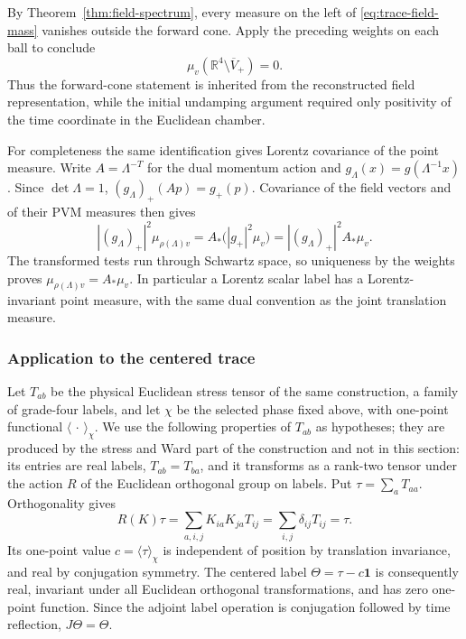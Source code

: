 By Theorem~\ref{thm:field-spectrum}, every measure on the left of
\eqref{eq:trace-field-mass} vanishes outside the forward cone.
Apply the preceding weights on each ball to conclude
\begin{equation}\label{eq:trace-forward}
 \mu_v(\mathbb R^4\setminus\overline V_+)=0.
\end{equation}
Thus the forward-cone statement is inherited from the reconstructed field
representation, while the initial undamping argument required only
positivity of the time coordinate in the Euclidean chamber.

For completeness the same identification gives Lorentz covariance of the
point measure. Write $A=\Lambda^{-T}$ for the dual momentum action and
$g_\Lambda(x)=g(\Lambda^{-1}x)$. Since $\det\Lambda=1$,
$(g_\Lambda)_+(Ap)=g_+(p)$. Covariance of the field vectors and of their
PVM measures then gives
\[
 |(g_\Lambda)_+|^2\mu_{\rho(\Lambda)v}
            =A_*\bigl(|g_+|^2\mu_v\bigr)
            =|(g_\Lambda)_+|^2 A_*\mu_v.
\]
The transformed tests run through Schwartz space, so uniqueness by the
weights proves $\mu_{\rho(\Lambda)v}=A_*\mu_v$. In particular a Lorentz
scalar label has a Lorentz-invariant point measure, with the same dual
convention as the joint translation measure.

\subsubsection{Application to the centered trace}
Let $T_{ab}$ be the physical Euclidean stress tensor of the same
construction, a family of grade-four labels, and let $\chi$ be the
selected phase fixed above, with one-point functional
$\langle\,\cdot\,\rangle_\chi$. We use the following properties of
$T_{ab}$ as hypotheses; they are produced by the stress and Ward part of
the construction and not in this section: its entries are real labels,
$T_{ab}=T_{ba}$, and it transforms as a rank-two tensor under the action
$R$ of the Euclidean orthogonal group on labels. Put
$\tau=\sum_aT_{aa}$. Orthogonality gives
\[
 R(K)\tau=\sum_{a,i,j}K_{ia}K_{ja}T_{ij}
          =\sum_{i,j}\delta_{ij}T_{ij}=\tau.
\]
Its one-point value $c=\langle\tau\rangle_\chi$ is independent of position
by translation invariance, and real by conjugation symmetry. The centered
label $\Theta=\tau-c\mathbf1$ is consequently real, invariant under all
Euclidean orthogonal transformations, and has zero one-point function.
Since the adjoint label operation is conjugation followed by time
reflection, $J\Theta=\Theta$.

